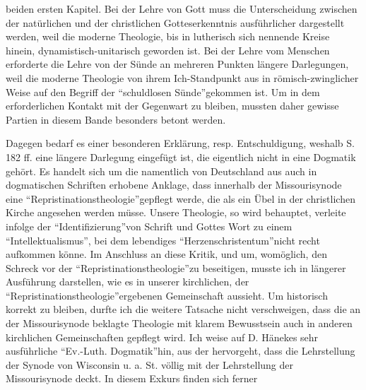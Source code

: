 beiden ersten Kapitel. Bei der Lehre von Gott muss die Unterscheidung zwischen der natürlichen und der christlichen Gotteserkenntnis ausführlicher dargestellt werden, weil die moderne Theologie, bis in lutherisch sich nennende Kreise hinein, dynamistisch-unitarisch geworden ist. Bei der Lehre vom Menschen erforderte die Lehre von der Sünde an mehreren Punkten längere Darlegungen, weil die moderne Theologie von ihrem Ich-Standpunkt aus in römisch-zwinglicher Weise auf den Begriff der \textquotedblleft schuldlosen Sünde\textquotedblright gekommen ist. Um in dem erforderlichen Kontakt mit der Gegenwart zu bleiben, mussten daher gewisse Partien in diesem Bande besonders betont werden.\par Dagegen bedarf es einer besonderen Erklärung, resp. Entschuldigung, weshalb S. 182 ff. eine längere Darlegung eingefügt ist, die eigentlich nicht in eine Dogmatik gehört. Es handelt sich um die namentlich von Deutschland aus auch in dogmatischen Schriften erhobene Anklage, dass innerhalb der Missourisynode eine \textquotedblleft Repristinationstheologie\textquotedblright gepflegt werde, die als ein Übel in der christlichen Kirche angesehen werden müsse. Unsere Theologie, so wird behauptet, verleite infolge der \textquotedblleft Identifizierung\textquotedblright von Schrift und Gottes Wort zu einem \textquotedblleft Intellektualismus\textquotedblright, bei dem lebendiges \textquotedblleft Herzenschristentum\textquotedblright nicht recht aufkommen könne. Im Anschluss an diese Kritik, und um, womöglich, den Schreck vor der \textquotedblleft Repristinationstheologie\textquotedblright zu beseitigen, musste ich in längerer Ausführung darstellen, wie es in unserer kirchlichen, der \textquotedblleft Repristinationstheologie\textquotedblright ergebenen Gemeinschaft aussieht. Um historisch korrekt zu bleiben, durfte ich die weitere Tatsache nicht verschweigen, dass die an der Missourisynode beklagte Theologie mit klarem Bewusstsein auch in anderen kirchlichen Gemeinschaften gepflegt wird. Ich weise auf D. Hänekes sehr ausführliche \textquotedblleft Ev.-Luth. Dogmatik\textquotedblright hin, aus der hervorgeht, dass die Lehrstellung der Synode von Wisconsin u. a. St. völlig mit der Lehrstellung der Missourisynode deckt. In diesem Exkurs finden sich ferner